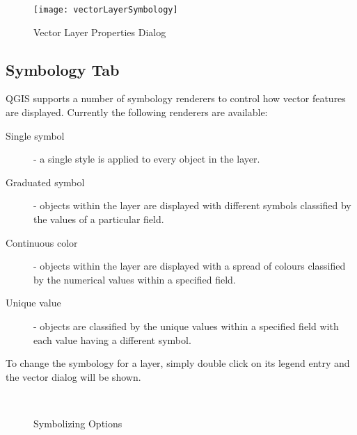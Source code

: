 \begin{figure}[H]
   \begin{center}
   \caption{Vector Layer Properties Dialog \nixcaption}\label{fig:vector_symbology}\smallskip
   \texttt{[image: vectorLayerSymbology]} 
\end{center}  
\end{figure}

\subsection{Symbology Tab}\label{sec:symbology}

QGIS supports a number of symbology renderers to control how
vector features are displayed. Currently the following renderers
are available:

\begin{description} 
    \item[Single symbol] - a single style is applied to every
    object in the layer.
    \item[Graduated symbol] - objects within the layer are
    displayed with different symbols classified by the values of a
    particular field.
    \item[Continuous color] - objects within the layer are
    displayed with a spread of colours classified by the numerical
    values within a specified field.
    \item[Unique value] - objects are classified by the unique
    values within a specified field with each value having a
    different symbol.
\end{description}

To change the symbology for a layer, simply double click on its legend 
entry and the vector  dialog will be 
shown.

\begin{figure}[h]
\centering
\caption{Symbolizing Options \nixcaption}
   \goodgap
   \\
   \goodgap
\end{figure}

